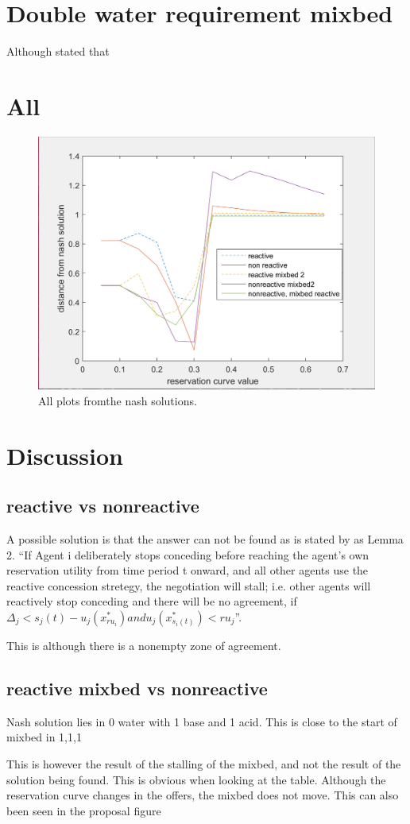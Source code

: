 \section{Double water requirement mixbed}
Although stated that 

\section{All}


\begin{figure}
	\centering
	\includegraphics[width=0.7\linewidth]{img/all_dist_from_nash_solutions}
	\caption{All plots fromthe nash solutions.}
	\label{fig:alldistfromnashsolutions}
\end{figure}






\section{Discussion}
\subsection{reactive vs nonreactive}
A possible solution is that the answer can not be found as is stated by \citet{zheng2015automated} as Lemma 2. ``If Agent i deliberately stops conceding before reaching the agent's own reservation utility from time period t onward, and all other agents use the reactive concession stretegy, the negotiation will stall; i.e. other agents will reactively stop conceding and there will be no agreement, if $\Delta_j < s_j(t)-u_j(x^*_{ru_i}) and u_j(x^*_{s_i(t)})<ru_j$''.

This is although there is a nonempty zone of agreement.

\subsection{reactive mixbed vs nonreactive}
Nash solution lies in 0 water with 1 base and 1 acid. This is close to the start of mixbed in 1,1,1

This is however the result of the stalling of the mixbed, and not the result of the solution being found. This is obvious when looking at the table. Although the reservation curve changes in the offers, the mixbed does not move. This can also been seen in the proposal figure

